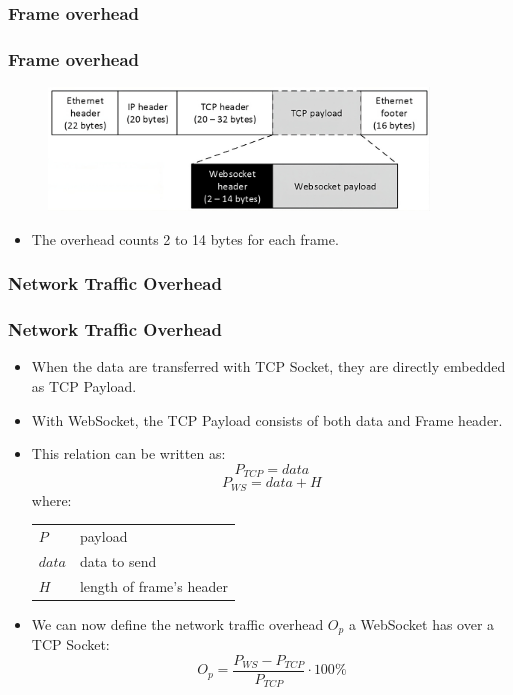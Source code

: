 \documentclass{beamer}
\makeatletter
\newenvironment{conditions}
  {\par\vspace{\abovedisplayskip}\noindent\begin{tabular}{>{$}l<{$} @{${}={}$} l}}
  {\end{tabular}\par\vspace{\belowdisplayskip}}
\makeatother
\begin{document}
\subsubsection{Frame overhead}
\begin{frame}
    \frametitle{Frame overhead}
    \begin{figure}
        \includegraphics[width=0.9\textwidth]{images/websocket_frame_overhead.jpeg}
    \end{figure}
    \pause{}
    \begin{itemize}[<+->]
        \item The overhead counts \alert{2 to 14 bytes} for each frame.
    \end{itemize}
\end{frame}

\subsubsection{Network Traffic Overhead}
\begin{frame}
    \frametitle{Network Traffic Overhead}
    \begin{itemize}[<+->]
        \item When the data are transferred with TCP Socket, they are \alert{directly
                  embedded as TCP Payload}.
        \item With WebSocket, the TCP Payload consists of both data and Frame header.
        \item This relation can be written as:
              \begin{equation}
                  P_{TCP} = data
              \end{equation}
              \begin{equation}
                  P_{WS} = data + H
              \end{equation}
              where:
              \begin{conditions}
                  P    & payload                 \\
                  data & data to send            \\
                  H    & length of frame's header
              \end{conditions}
        \item We can now define the \alert{network traffic overhead $O_p$} a WebSocket has
              over a TCP Socket:
              \begin{equation}
                  O_p = \frac{P_{WS} - P_{TCP}}{P_{TCP}}\cdot 100\%
              \end{equation}
    \end{itemize}
\end{frame}
\end{document}

